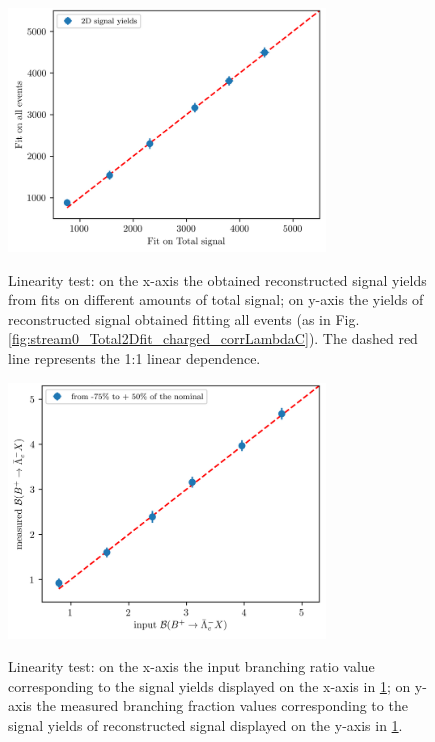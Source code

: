 \begin{figure}[H]
{\includegraphics[width=0.75\textwidth]{04-chargedCorrBtoLambda/figs/ReconstructedSignal_Fit_LinearityTest_chargedCorrLambdaC.png}}
\caption{Linearity test: on the x-axis the obtained reconstructed signal yields from fits on different amounts of total signal; on y-axis the yields of reconstructed signal obtained fitting all events
 (as in Fig. \ref{fig:stream0_Total2Dfit_charged_corrLambdaC}). The dashed red line represents the 1:1 linear dependence.}
\label{fig:LinearityTest_chargedCorrLambdaC}
\end{figure}



\begin{figure}[H]  
{\includegraphics[width=0.75\textwidth]{04-chargedCorrBtoLambda/figs/chargedCorrLambdaC_BR_linearity.png}}
\caption{Linearity test: on the x-axis the input branching ratio value corresponding to the signal yields displayed on the x-axis in \cref{fig:LinearityTest_chargedCorrLambdaC}; 
on y-axis the measured branching fraction values corresponding to the signal yields of reconstructed signal displayed on the y-axis in \cref{fig:LinearityTest_chargedCorrLambdaC}.}
\label{fig:LinearityTest_BR_chargedCorrLambdaC}
\end{figure}

